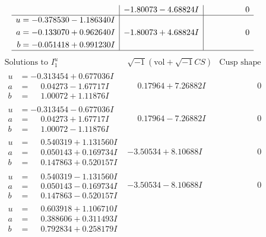 \documentclass[1p]{elsarticle_modified}
\theoremstyle{definition}
\newcommand{\I}{\sqrt{-1}}
\begin{document}
$$\begin{array}{c|c|c}
 & -1.80073 - 4.68824 I & \phantom{-0.000000 } 0 \\ \hline\begin{aligned}
u &= -0.378530 - 1.186340 I \\
a &= -0.133070 + 0.962640 I \\
b &= -0.051418 + 0.991230 I\end{aligned}
 & -1.80073 + 4.68824 I & \phantom{-0.000000 } 0\\
 \hline 
 \end{array}$$\newpage$$\begin{array}{c|c|c}  
\text{Solutions to }I^u_{1}& \I (\text{vol} + \sqrt{-1}CS) & \text{Cusp shape}\\
 \hline 
\begin{aligned}
u &= -0.313454 + 0.677036 I \\
a &= \phantom{-}0.04273 - 1.67717 I \\
b &= \phantom{-}1.00072 + 1.11876 I\end{aligned}
 & \phantom{-}0.17964 + 7.26882 I & \phantom{-0.000000 } 0 \\ \hline\begin{aligned}
u &= -0.313454 - 0.677036 I \\
a &= \phantom{-}0.04273 + 1.67717 I \\
b &= \phantom{-}1.00072 - 1.11876 I\end{aligned}
 & \phantom{-}0.17964 - 7.26882 I & \phantom{-0.000000 } 0 \\ \hline\begin{aligned}
u &= \phantom{-}0.540319 + 1.131560 I \\
a &= \phantom{-}0.050143 + 0.169734 I \\
b &= \phantom{-}0.147863 + 0.520157 I\end{aligned}
 & -3.50534 + 8.10688 I & \phantom{-0.000000 } 0 \\ \hline\begin{aligned}
u &= \phantom{-}0.540319 - 1.131560 I \\
a &= \phantom{-}0.050143 - 0.169734 I \\
b &= \phantom{-}0.147863 - 0.520157 I\end{aligned}
 & -3.50534 - 8.10688 I & \phantom{-0.000000 } 0 \\ \hline\begin{aligned}
u &= \phantom{-}0.603918 + 1.106710 I \\
a &= \phantom{-}0.388606 + 0.311493 I \\
b &= \phantom{-}0.792834 + 0.258179 I\end{aligned}

\end{array}$$
\end{document}
